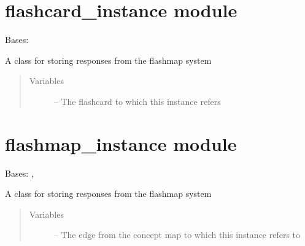 \documentclass[letterpaper,10pt,english]{sphinxmanual}
\begin{document}
\section{flashcard\_instance module}
\label{\detokenize{flashcard_instance:module-flashcard_instance}}\label{\detokenize{flashcard_instance:flashcard-instance-module}}\label{\detokenize{flashcard_instance::doc}}

\begin{fulllineitems}
\label{\detokenize{flashcard_instance:flashcard_instance.FlashcardInstance}}
Bases: {\hyperref[\detokenize{instance:instance.Instance}]{}}

A class for storing responses from the flashmap system
\begin{quote}\begin{description}
\item[{Variables}] \leavevmode
{} -- The flashcard to which this instance refers

\end{description}\end{quote}

\end{fulllineitems}



\section{flashmap\_instance module}
\label{\detokenize{flashmap_instance:flashmap-instance-module}}\label{\detokenize{flashmap_instance:module-flashmap_instance}}\label{\detokenize{flashmap_instance::doc}}

\begin{fulllineitems}
\label{\detokenize{flashmap_instance:flashmap_instance.FlashmapInstance}}
Bases: {\hyperref[\detokenize{instance:instance.Instance}]{}}, 

A class for storing responses from the flashmap system
\begin{quote}\begin{description}
\item[{Variables}] \leavevmode
{} -- The edge from the concept map to which this instance refers to

\end{description}\end{quote}

\end{fulllineitems}
\end{document}

